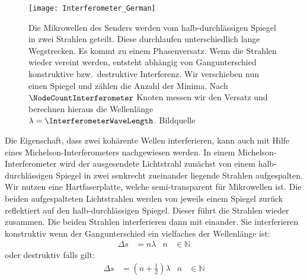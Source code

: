 \documentclass[a4paper,10pt,twocolumn]{article}
\begin{document}
    \begin{figure}[htbp]
        \texttt{[image: Interferometer\_German]}
        \center
        \caption{
        Die Mikrowellen des Senders werden vom halb-durchlässigen Spiegel in zwei Strahlen geteilt.
        Diese durchlaufen unterschiedlich lange Wegstrecken.
        Es kommt zu einem Phasenversatz.
        Wenn die Strahlen wieder vereint werden, entsteht abhängig von Gangunterschied konstruktive
        bzw.\ destruktive Interferenz.
        Wir verschieben nun einen Spiegel und zählen die Anzahl der Minima.
        Nach $\NodeCountInterferometer$ Knoten messen wir den Versatz und berechnen hieraus die Wellenlänge
        $\lambda = \InterferometerWaveLength$.
        Bildquelle~\cite{imageMichelsonInterferometerWiki}
        }
        \label{fig:Interferometer}
    \end{figure}
    
    
    Die Eigenschaft, dass zwei kohärente Wellen interferieren, kann auch mit Hilfe eines Michelson-Interferometers
    nachgewiesen werden.
    In einem Michelson-Interferometer wird der ausgesendete Lichtstrahl zunächst von einem halb-durchlässigen
    Spiegel in zwei senkrecht zueinander liegende Strahlen aufgespalten.
    Wir nutzen eine Hartfaserplatte, welche semi-transparent für Mikrowellen ist.
    Die beiden aufgespalteten Lichtstrahlen werden von jeweils einem Spiegel zurück reflektiert auf den
    halb-durchlässigen Spiegel.
    Dieser führt die Strahlen wieder zusammen.
    Die beiden Strahlen interferieren dann mit einander.
    Sie interferieren konstruktiv wenn der Gangunterschied ein vielfaches der Wellenlänge ist:
    \begin{align*}
        \Delta s &= n \lambda & n &\in \mathds{N}
    \end{align*}
    oder destruktiv falls gilt:
    \begin{align*}
        \Delta s &= (n + \frac{1}{2}) \lambda & n &\in \mathds{N}
    \end{align*}
    
\end{document}
